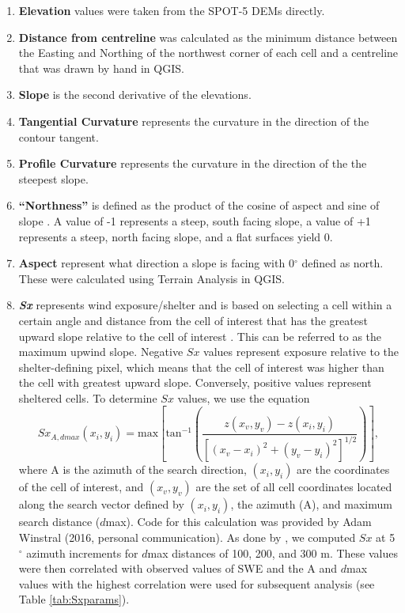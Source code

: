 \documentclass[12pt]{article}
\begin{document}
\begin{enumerate}
\item[]\textbf{Elevation} values were taken from the SPOT-5 DEMs directly.

\item[] \textbf{Distance from centreline} was calculated as the minimum distance between the Easting and Northing of the northwest corner of each cell and a centreline that was drawn by hand in QGIS. 

\item[]  \textbf{Slope} is the second derivative of the elevations. 

\item[] \textbf{Tangential Curvature} represents the curvature in the direction of the contour tangent.

\item[] \textbf{Profile Curvature} represents the curvature in the direction of the the steepest slope.

\item[] \textbf{``Northness''} is defined as the product of the cosine of aspect and sine of slope \citep{Molotch2005}. A value of -1 represents a steep, south facing slope, a value of +1 represents a steep, north facing slope, and a flat surfaces yield 0. 

\item[] \textbf{Aspect} represent what direction a slope is facing with 0${^\circ}$ defined as north. These were calculated using Terrain Analysis in QGIS. 

\item[] \textbf{\textit{Sx}} represents wind exposure/shelter and is based on selecting a cell within a certain angle and distance from the cell of interest that has the greatest upward slope relative to the cell of interest \citep{Winstral2002}. This can be referred to as the maximum upwind slope. Negative $Sx$ values represent exposure relative to the shelter-defining pixel, which means that the cell of interest was higher than the cell with greatest upward slope. Conversely, positive values represent sheltered cells. To determine $Sx$ values, we use the equation
\begin{equation}
Sx_{A, dmax}(x_i, y_i) = \textrm{max} \left[ \textrm{tan}^{-1} \left( \frac{z(x_v,y_v)-z(x_i,y_i)}{[(x_v-x_i)^2+(y_v-y_i)^2]^{1/2}} \right) \right] ,
\end{equation}
where A is the azimuth of the search direction, $(x_i, y_i)$ are the coordinates of the cell of interest, and $(x_v, y_v)$ are the set of all cell coordinates located along the search vector defined by	$(x_i, y_i)$, the azimuth (A), and maximum search distance ($d$max). Code for this calculation was provided by Adam Winstral (2016, personal communication). As done by \cite{McGrath2015}, we computed $Sx$ at 5$^{\circ}$ azimuth increments for $d$max distances of 100, 200, and 300 m. These values were then correlated with observed values of SWE and the A and $d$max values with the highest correlation were used for subsequent analysis (see Table \ref{tab:Sxparams}). 


\end{enumerate}
\end{document}
